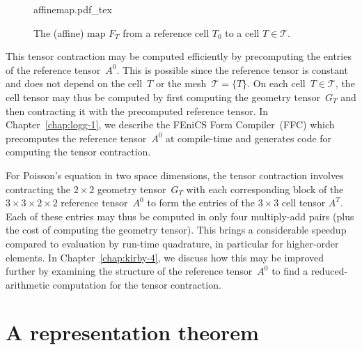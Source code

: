 \begin{figure}[htbp]
  \begin{center}
    \def\svgwidth{\largefig}
    {affinemap.pdf_tex}
    \caption{The (affine) map $F_T$ from a reference cell $T_0$
      to a cell $T \in \mathcal{T}$.}
    \label{fig:affinemap}
  \end{center}
\end{figure}

This tensor contraction may be computed efficiently by precomputing
the entries of the reference tensor~$A^0$. This is possible since the
reference tensor is constant and does not depend on the cell~$T$ or
the mesh~$\mathcal{T} = \{T\}$. On each cell~$T \in \mathcal{T}$, the
cell tensor may thus be computed by first computing the geometry
tensor~$G_T$ and then contracting it with the precomputed reference
tensor. In Chapter~\ref{chap:logg-1}, we describe the FEniCS Form
Compiler~(FFC) which precomputes the reference tensor~$A^0$ at
compile-time and generates code for computing the tensor contraction.

For Poisson's equation in two space dimensions, the tensor contraction
involves contracting the $2 \times 2$ geometry tensor~$G_T$ with each
corresponding block of the $3 \times 3 \times 2 \times 2$ reference
tensor~$A^0$ to form the entries of the $3 \times 3$ cell tensor
$A^T$. Each of these entries may thus be computed in only four
multiply-add pairs (plus the cost of computing the geometry
tensor). This brings a considerable speedup compared to evaluation by
run-time quadrature, in particular for higher-order elements. In
Chapter~\ref{chap:kirby-4}, we discuss how this may be improved
further by examining the structure of the reference tensor~$A^0$ to
find a reduced-arithmetic computation for the tensor contraction.

\section{A representation theorem}

